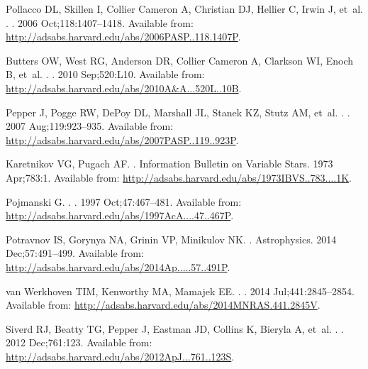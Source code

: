\documentclass[]{rsos}
\begin{document}
\begin{thebibliography}{10}
{Pollacco} DL, {Skillen} I, {Collier Cameron} A, {Christian} DJ, {Hellier} C,
  {Irwin} J, et~al.
.
\newblock \pasp. 2006 Oct;118:1407--1418.
\newblock Available from:
  \url{http://adsabs.harvard.edu/abs/2006PASP..118.1407P}.

{Butters} OW, {West} RG, {Anderson} DR, {Collier Cameron} A, {Clarkson} WI,
  {Enoch} B, et~al.
.
\newblock \aap. 2010 Sep;520:L10.
\newblock Available from:
  \url{http://adsabs.harvard.edu/abs/2010A&A...520L..10B}.

{Pepper} J, {Pogge} RW, {DePoy} DL, {Marshall} JL, {Stanek} KZ, {Stutz} AM,
  et~al.
.
\newblock \pasp. 2007 Aug;119:923--935.
\newblock Available from:
  \url{http://adsabs.harvard.edu/abs/2007PASP..119..923P}.

{Karetnikov} VG, {Pugach} AF.
.
\newblock Information Bulletin on Variable Stars. 1973 Apr;783:1.
\newblock Available from:
  \url{http://adsabs.harvard.edu/abs/1973IBVS..783....1K}.

{Pojmanski} G.
.
\newblock \actaa. 1997 Oct;47:467--481.
\newblock Available from:
  \url{http://adsabs.harvard.edu/abs/1997AcA....47..467P}.

{Potravnov} IS, {Gorynya} NA, {Grinin} VP, {Minikulov} NK.
.
\newblock Astrophysics. 2014 Dec;57:491--499.
\newblock Available from:
  \url{http://adsabs.harvard.edu/abs/2014Ap.....57..491P}.

{van Werkhoven} TIM, {Kenworthy} MA, {Mamajek} EE.
.
\newblock \mnras. 2014 Jul;441:2845--2854.
\newblock Available from:
  \url{http://adsabs.harvard.edu/abs/2014MNRAS.441.2845V}.

{Siverd} RJ, {Beatty} TG, {Pepper} J, {Eastman} JD, {Collins} K, {Bieryla} A,
  et~al.
.
\newblock \apj. 2012 Dec;761:123.
\newblock Available from:
  \url{http://adsabs.harvard.edu/abs/2012ApJ...761..123S}.


\end{thebibliography}
\end{document}
